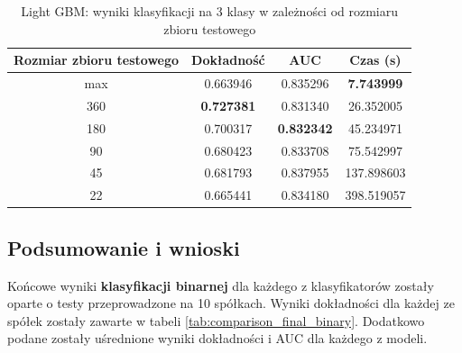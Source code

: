 \documentclass[a4paper, twoside, 11pt, openright]{article}
\begin{document}
\begin{table}[H]
    \centering
    \begin{tabular}{|c|c|c|c|}
    \hline
        \textbf{Rozmiar zbioru testowego} & \textbf{Dokładność} & \textbf{AUC} & \textbf{Czas (s)} \\ \hline
max   						 &  0.663946 &  0.835296 &  \textbf{7.743999} \\ \hline
360                         &  \textbf{0.727381} &  0.831340 &   26.352005 \\ \hline
180                         &  0.700317 &  \textbf{0.832342} &   45.234971 \\ \hline
90                          &  0.680423 &  0.833708 &   75.542997 \\ \hline
45                          &  0.681793 &  0.837955 &  137.898603 \\ \hline
22                          &  0.665441 &  0.834180 &  398.519057 \\ \hline
    \end{tabular}
    \caption{Light GBM: wyniki klasyfikacji na 3 klasy w zależności od rozmiaru zbioru testowego}
    \label{tab:lgbm_walk_forward_discrete}
\end{table}


\subsection{Podsumowanie i wnioski}

Końcowe wyniki \textbf{klasyfikacji binarnej} dla każdego z klasyfikatorów zostały oparte o testy przeprowadzone na 10 spółkach. Wyniki dokładności dla każdej ze spółek zostały zawarte w tabeli \ref{tab:comparison_final_binary}. Dodatkowo podane zostały uśrednione wyniki dokładności i AUC dla każdego z modeli. 
\end{document}
